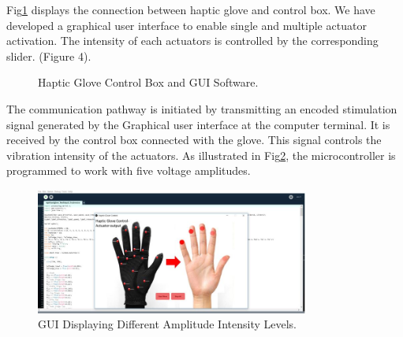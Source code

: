 Fig\ref{fig:glove-gui} displays the connection between haptic glove and control
box. We have developed a graphical user interface to enable single and
multiple actuator activation. The intensity of each actuators is
controlled by the corresponding slider.  (Figure 4).

\begin{figure}[!ht]
  \centering
  \caption{Haptic Glove Control Box and GUI Software.}
  \label{fig:glove-gui}
\end{figure}

The communication pathway is initiated by transmitting an encoded stimulation signal generated by the Graphical user interface at the computer terminal. It is received by the control box connected with the glove. This signal controls the vibration intensity of the actuators. As illustrated in Fig\ref{fig:gui-code}, the microcontroller is programmed to work with five voltage amplitudes. 

\begin{figure}[!ht]
  \centering
  \includegraphics[width=9cm]{figures/figure5.jpg}
  \caption{GUI Displaying Different Amplitude Intensity Levels.}
  \label{fig:gui-code}
\end{figure}


